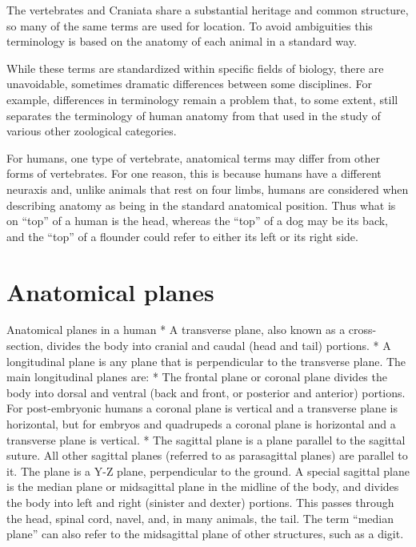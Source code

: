 The vertebrates and Craniata share a substantial heritage and common structure, so many of the same terms are used for location. To avoid ambiguities this terminology is based on the anatomy of each animal in a standard way.

While these terms are standardized within specific fields of biology, there are unavoidable, sometimes dramatic differences between some disciplines. For example, differences in terminology remain a problem that, to some extent, still separates the terminology of human anatomy from that used in the study of various other zoological categories.

For humans, one type of vertebrate, anatomical terms may differ from other forms of vertebrates. For one reason, this is because humans have a different neuraxis and, unlike animals that rest on four limbs, humans are considered when describing anatomy as being in the standard anatomical position. Thus what is on ``top'' of a human is the head, whereas the ``top'' of a dog may be its back, and the ``top'' of a flounder could refer to either its left or its right side.

\hypertarget{anatomical-planes}{%
\section{Anatomical planes}\label{anatomical-planes}}

Anatomical planes in a human
* A transverse plane, also known as a cross-section, divides the body into cranial and caudal (head and tail) portions.
* A longitudinal plane is any plane that is perpendicular to the transverse plane. The main longitudinal planes are:
* The frontal plane or coronal plane divides the body into dorsal and ventral (back and front, or posterior and anterior) portions. For post-embryonic humans a coronal plane is vertical and a transverse plane is horizontal, but for embryos and quadrupeds a coronal plane is horizontal and a transverse plane is vertical.
* The sagittal plane is a plane parallel to the sagittal suture. All other sagittal planes (referred to as parasagittal planes) are parallel to it. The plane is a Y-Z plane, perpendicular to the ground.
A special sagittal plane is the median plane or midsagittal plane in the midline of the body, and divides the body into left and right (sinister and dexter) portions. This passes through the head, spinal cord, navel, and, in many animals, the tail. The term ``median plane'' can also refer to the midsagittal plane of other structures, such as a digit.

